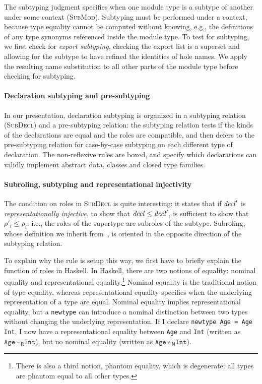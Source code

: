 The subtyping judgment specifies when one module type
is a subtype of another under some context (\textsc{SubMod}).
Subtyping must be performed under a context, because type equality
cannot be computed without knowing, e.g., the definitions of any
type synonyms referenced inside the module type.  To test for
subtyping, we first check for \emph{export subtyping}, checking
the export list is a superset and allowing for the subtype to have
refined the identities of hole names.  We apply the resulting
name substitution to all other parts of the module type before
checking for subtyping.

\paragraph{Declaration subtyping and pre-subtyping}
In our presentation, declaration subtyping is organized in a subtyping
relation (\textsc{SubDecl}) and a pre-subtyping relation: the subtyping
relation tests if the kinds of the declarations are equal and the roles
are compatible, and then defers to the pre-subtyping relation for
case-by-case subtyping on each different type of declaration.  The
non-reflexive rules are boxed, and specify which declarations can
validly implement abstract data, classes and closed type families.

\paragraph{Subroling, subtyping and representational injectivity}
The condition on roles in \textsc{SubDecl} is quite interesting:
it states that if $\mathit{decl}'$ is \emph{representationally injective},
to show that $\mathit{decl} \le \mathit{decl}'$,
is sufficient to show that $\overline{\rho'_i \le \rho_i}$: i.e.,
the roles of the supertype are subroles of the subtype.
Subroling, whose definition we inherit from~\cite{Breitner:2014:SZC:2692915.2628141},
is oriented in the opposite direction of the subtyping relation.

To explain why the rule is setup this way, we first have to briefly
explain
the function of roles in Haskell.  In Haskell, there are two notions of
equality: nominal equality and representational equality.\footnote{There is also
a third notion, phantom equality, which is degenerate: all types are phantom
equal to all other types.}  Nominal
equality is the traditional notion of type equality, whereas
representational equality specifies when the underlying representation
of a type are equal.  Nominal equality implies representational
equality, but a \verb|newtype| can introduce a nominal distinction between
two types without changing the underlying representation. If I declare
\verb|newtype Age = Age Int|, I now have a representational equality
between \verb|Age| and \verb|Int| (written as $\texttt{Age}
\sim_\textsf{R} \texttt{Int}$), but no nominal equality (written as $\texttt{Age}
\not\sim_\textsf{N} \texttt{Int}$).

